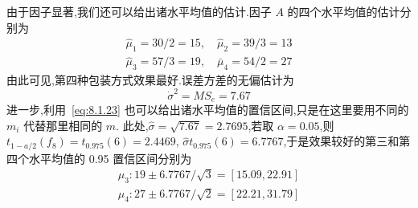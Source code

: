 \begin{example}
  由于因子显著,我们还可以给出诸水平均值的估计.因子 $A$ 的四个水平均值的估计分别为 
  \begin{gather*}
    \hat{\mu}_{1}=30 / 2=15, \quad \hat{\mu}_{2}=39 / 3=13 \\
    \hat{\mu}_{3}=57 / 3=19, \quad \bar{\mu}_{4}=54 / 2=27
  \end{gather*} 
  由此可见,第四种包装方式效果最好.误差方差的无偏估计为
  \begin{equation*}
    \dot{\sigma}^{2}=M S_{e}=7.67
  \end{equation*}
  进一步,利用~\eqref{eq:8.1.23} 也可以给出诸水平均值的置信区间,只是在这里要用不同的 $m_i$ 代替那里相同的 $m$. 此处,$\hat{\sigma} = \sqrt{7.67}=2.7695$,若取 $\alpha=0.05$,则 $t_{1-a / 2}\left(f_{8}\right)=t_{0.975}(6)=2.4469$, $\hat{\sigma} t_{0.975}(6)=6.7767$,于是效果较好的第三和第四个水平均值的 0.95 置信区间分别为
\begin{gather*}
  \mu_{3} : 19 \pm 6.7767 / \sqrt{3}=[15.09,22.91] \\
  \mu_{4} : 27 \pm 6.7767 / \sqrt{2}=[22.21,31.79]
\end{gather*}
\end{example}

